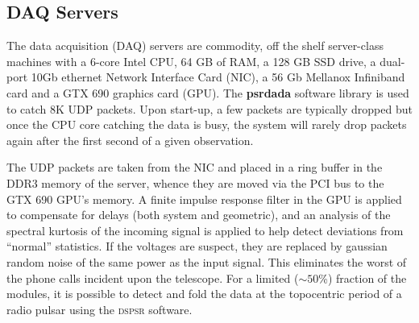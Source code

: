 \subsection {DAQ Servers}

The data acquisition (DAQ) servers are commodity, off the shelf server-class machines with a 6-core Intel CPU, 64 GB of RAM, a 128 GB SSD drive, a dual-port 10Gb ethernet Network Interface Card (NIC), a 56 Gb Mellanox Infiniband card and a GTX 690 graphics card (GPU). The {\bf psrdada} software library is used to catch 8K UDP packets. Upon start-up, a few packets are typically dropped but once the CPU core catching the data is busy, the system will rarely drop packets again after the first second of a given observation. 

The UDP packets are taken from the NIC and placed in a ring buffer in the DDR3 memory of the server, whence they are moved via the PCI bus to the GTX 690 GPU's memory. A finite impulse response filter in the GPU is applied to compensate for delays (both system and geometric), and an analysis of the spectral kurtosis of the incoming signal is applied to help detect deviations from ``normal'' statistics. If the voltages are suspect, they are replaced by gaussian random noise of the same power as the input signal. This eliminates the worst of the phone calls incident upon the telescope. For a limited ($\sim50$\%) fraction of the modules, it is possible to detect and fold the data at the topocentric period of a radio pulsar using the \textsc{dspsr} software.


  